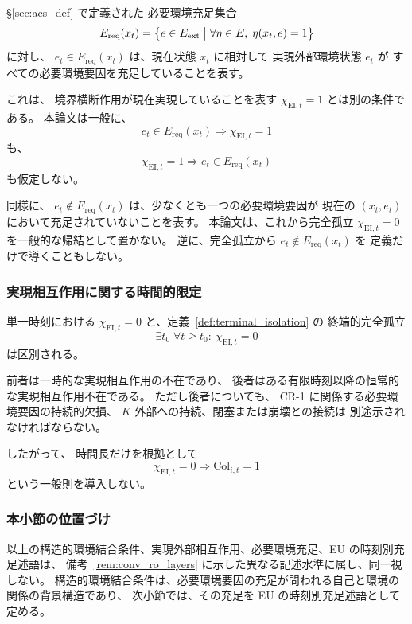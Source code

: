 \begin{remark}[実現相互作用と必要環境充足の区別]
\label{rem:ei_vs_ereq}
\S\ref{sec:acs_def} で定義された
必要環境充足集合
\[
  E_{\mathrm{req}}(x_t)
  =
  \bigl\{
    e\in E_{\mathrm{ext}}
    \bigm|
    \forall\eta\in E,\;
    \eta(x_t,e)=1
  \bigr\}
\]
に対し、
$e_t\in E_{\mathrm{req}}(x_t)$
は、現在状態 $x_t$ に相対して
実現外部環境状態 $e_t$ が
すべての必要環境要因を充足していることを表す。

これは、
境界横断作用が現在実現していることを表す
$\chi_{\mathrm{EI},t}=1$
とは別の条件である。
本論文は一般に、
\[
  e_t\in E_{\mathrm{req}}(x_t)
  \Longrightarrow
  \chi_{\mathrm{EI},t}=1
\]
も、
\[
  \chi_{\mathrm{EI},t}=1
  \Longrightarrow
  e_t\in E_{\mathrm{req}}(x_t)
\]
も仮定しない。

同様に、
$e_t\notin E_{\mathrm{req}}(x_t)$
は、少なくとも一つの必要環境要因が
現在の $(x_t,e_t)$ において充足されていないことを表す。
本論文は、これから完全孤立
$\chi_{\mathrm{EI},t}=0$
を一般的な帰結として置かない。
逆に、完全孤立から
$e_t\notin E_{\mathrm{req}}(x_t)$ を
定義だけで導くこともしない。
\end{remark}

\subsubsection{実現相互作用に関する時間的限定}

\begin{remark}[一時的孤立と終端的完全孤立の区別]
\label{rem:temporary_terminal_isolation}
単一時刻における
$\chi_{\mathrm{EI},t}=0$
と、定義~\ref{def:terminal_isolation} の
終端的完全孤立
\[
  \exists t_0\;
  \forall t\ge t_0:\
  \chi_{\mathrm{EI},t}=0
\]
は区別される。

前者は一時的な実現相互作用の不在であり、
後者はある有限時刻以降の恒常的な実現相互作用不在である。
ただし後者についても、
CR-1 に関係する必要環境要因の持続的欠損、
$K$ 外部への持続、閉塞または崩壊との接続は
別途示されなければならない。

したがって、
時間長だけを根拠として
\[
  \chi_{\mathrm{EI},t}=0
  \Longrightarrow
  \mathrm{Col}_{i,t}=1
\]
という一般則を導入しない。
\end{remark}

\subsubsection{本小節の位置づけ}

以上の構造的環境結合条件、実現外部相互作用、必要環境充足、EU の時刻別充足述語は、
備考~\ref{rem:conv_ro_layers} に示した異なる記述水準に属し、同一視しない。
構造的環境結合条件は、必要環境要因の充足が問われる自己と環境の関係の背景構造であり、
次小節では、その充足を EU の時刻別充足述語として定める。

